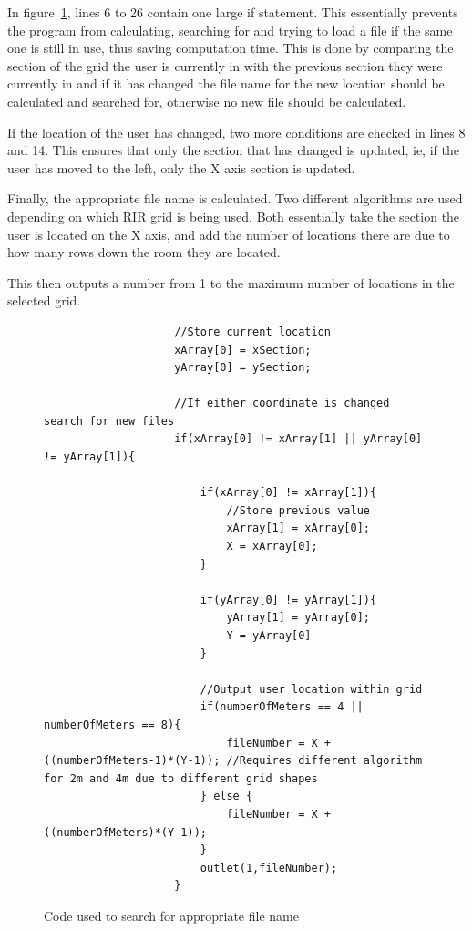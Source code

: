 \documentclass[../../main.tex]{subfiles}
\begin{document}
					 In figure~\ref{jsFile}, lines 6 to 26 contain one large if statement. This essentially prevents the program from calculating, searching for and trying to load a file if the same one is still in use, thus saving computation time. This is done by comparing the section of the grid the user is currently in with the previous section they were currently in and if it has changed the file name for the new location should be calculated and searched for, otherwise no new file should be calculated.

					 If the location of the user has changed, two more conditions are checked in lines 8 and 14. This ensures that only the section that has changed is updated, ie, if the user has moved to the left, only the X axis section is updated.

					 Finally, the appropriate file name is calculated. Two different algorithms are used depending on which \ac{RIR} grid is being used. Both essentially take the section the user is located on the X axis, and add the number of locations there are due to how many rows down the room they are located.

					 This then outputs a number from 1 to the maximum number of locations in the selected grid.

				
					\begin{figure}[H]
					\begin{lstlisting}
					//Store current location
					xArray[0] = xSection;
					yArray[0] = ySection;

					//If either coordinate is changed search for new files
					if(xArray[0] != xArray[1] || yArray[0] != yArray[1]){
						
						if(xArray[0] != xArray[1]){
							//Store previous value
							xArray[1] = xArray[0];
							X = xArray[0];
						}
						
						if(yArray[0] != yArray[1]){
							yArray[1] = yArray[0];
							Y = yArray[0]
						}
						
						//Output user location within grid
						if(numberOfMeters == 4 || numberOfMeters == 8){
							fileNumber = X + ((numberOfMeters-1)*(Y-1)); //Requires different algorithm for 2m and 4m due to different grid shapes
						} else {
							fileNumber = X + ((numberOfMeters)*(Y-1));
						}	
						outlet(1,fileNumber);
					}
					\end{lstlisting}
					\caption{Code used to search for appropriate file name}
					\label{jsFile}
					\end{figure}
		
\end{document}
